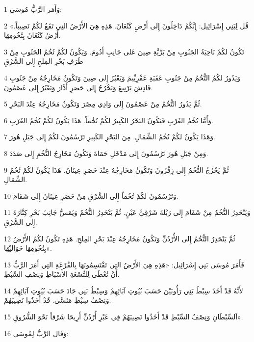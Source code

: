 \par 1 وَأَمَر الرَّبُّ مُوسَى:
\par 2 «قُل لِبَنِي إِسْرَائِيل: إِنَّكُمْ دَاخِلُونَ إِلى أَرْضِ كَنْعَانَ. هَذِهِ هِيَ الأَرْضُ التِي تَقَعُ لكُمْ نَصِيباً. أَرْضُ كَنْعَانَ بِتُخُومِهَا.
\par 3 تَكُونُ لكُمْ نَاحِيَةُ الجَنُوبِ مِنْ بَرِّيَّةِ صِينَ عَلى جَانِبِ أَدُومَ. وَيَكُونُ لكُمْ تُخُمُ الجَنُوبِ مِنْ طَرَفِ بَحْرِ المِلحِ إِلى الشَّرْقِ
\par 4 وَيَدُورُ لكُمُ التُّخُمُ مِنْ جَنُوبِ عَقَبَةِ عَقْرِبِّيمَ وَيَعْبُرُ إِلى صِينَ وَتَكُونُ مَخَارِجُهُ مِنْ جَنُوبِ قَادِشَ بَرْنِيعَ وَيَخْرُجُ إِلى حَصَرِ أَدَّارَ وَيَعْبُرُ إِلى عَصْمُونَ.
\par 5 ثُمَّ يَدُورُ التُّخُمُ مِنْ عَصْمُونَ إِلى وَادِي مِصْرَ وَتَكُونُ مَخَارِجُهُ عِنْدَ البَحْرِ.
\par 6 وَأَمَّا تُخُمُ الغَرْبِ فَيَكُونُ البَحْرُ الكَبِيرُ لكُمْ تُخُماً. هَذَا يَكُونُ لكُمْ تُخُمُ الغَرْبِ.
\par 7 وَهَذَا يَكُونُ لكُمْ تُخُمُ الشِّمَالِ. مِنَ البَحْرِ الكَبِيرِ تَرْسُمُونَ لكُمْ إِلى جَبَلِ هُورَ.
\par 8 وَمِنْ جَبَلِ هُورَ تَرْسُمُونَ إِلى مَدْخَلِ حَمَاةَ وَتَكُونُ مَخَارِجُ التُّخُمِ إِلى صَدَدَ.
\par 9 ثُمَّ يَخْرُجُ التُّخُمُ إِلى زِفْرُونَ وَتَكُونُ مَخَارِجُهُ عِنْدَ حَصَرِ عِينَانَ. هَذَا يَكُونُ لكُمْ تُخُمُ الشِّمَالِ.
\par 10 وَتَرْسُمُونَ لكُمْ تُخُماً إِلى الشَّرْقِ مِنْ حَصَرِ عِينَانَ إِلى شَفَامَ.
\par 11 وَيَنْحَدِرُ التُّخُمُ مِنْ شَفَامَ إِلى رَبْلةَ شَرْقِيَّ عَيْنٍ. ثُمَّ يَنْحَدِرُ التُّخُمُ وَيَمَسُّ جَانِبَ بَحْرِ كِنَّارَةَ إِلى الشَّرْقِ.
\par 12 ثُمَّ يَنْحَدِرُ التُّخُمُ إِلى الأُرْدُنِّ وَتَكُونُ مَخَارِجُهُ عِنْدَ بَحْرِ المِلحِ. هَذِهِ تَكُونُ لكُمُ الأَرْضُ بِتُخُومِهَا حَوَاليْهَا».
\par 13 فَأَمَرَ مُوسَى بَنِي إِسْرَائِيل: «هَذِهِ هِيَ الأَرْضُ التِي تَقْتَسِمُونَهَا بِالقُرْعَةِ التِي أَمَرَ الرَّبُّ أَنْ تُعْطَى لِلتِّسْعَةِ الأَسْبَاطِ وَنِصْفِ السِّبْطِ.
\par 14 لأَنَّهُ قَدْ أَخَذَ سِبْطُ بَنِي رَأُوبَيْنَ حَسَبَ بُيُوتِ آبَائِهِمْ وَسِبْطُ بَنِي جَادَ حَسَبَ بُيُوتِ آبَائِهِمْ وَنِصْفُ سِبْطِ مَنَسَّى. قَدْ أَخَذُوا نَصِيبَهُمْ.
\par 15 اَلسِّبْطَانِ وَنِصْفُ السِّبْطِ قَدْ أَخَذُوا نَصِيبَهُمْ فِي عَبْرِ أُرْدُنِّ أَرِيحَا شَرْقاً نَحْوَ الشُّرُوقِ».
\par 16 وَقَال الرَّبُّ لِمُوسَى:
